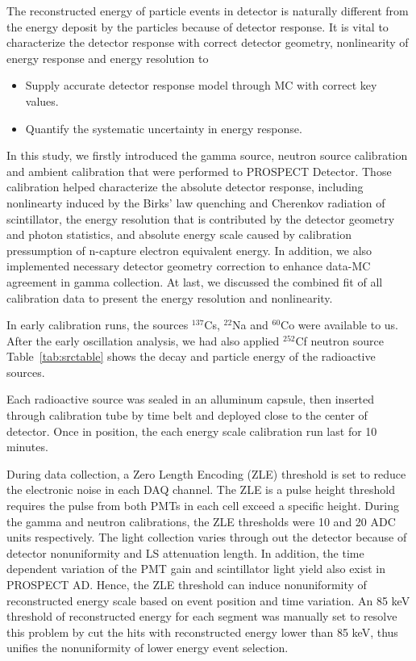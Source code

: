 
The reconstructed energy of particle events in detector is naturally different from the energy deposit by the particles because of detector response. 
It is vital to characterize the detector response with correct detector geometry, nonlinearity of energy response and energy resolution to
\begin{itemize}
    \item Supply accurate detector response model through MC with correct key values.
    \item Quantify the systematic uncertainty in energy response. 
\end{itemize}

In this study, we firstly introduced the gamma source, neutron source calibration and ambient calibration that were performed to PROSPECT Detector. 
Those calibration helped characterize the absolute detector response, including nonlinearty induced by the Birks' law quenching and Cherenkov radiation of scintillator, the energy resolution that is contributed by the detector geometry and photon statistics, and absolute energy scale caused by calibration pressumption of n-capture electron equivalent energy. 
In addition, we also implemented necessary detector geometry correction to enhance data-MC agreement in gamma collection.
At last, we discussed the combined fit of all calibration data to present the energy resolution and nonlinearity.



In early calibration runs, the sources $^{137}$Cs, $^{22}$Na and $^{60}$Co were available to us. 
After the early oscillation analysis, we had also applied $^{252}$Cf neutron source 
Table~\ref{tab:srctable} shows the decay and particle energy of the radioactive sources.

Each radioactive source was sealed in an alluminum capsule, then inserted through calibration tube by time belt and deployed close to the center of detector.
Once in position, the each energy scale calibration run last for 10 minutes.

During data collection, a Zero Length Encoding (ZLE) threshold is set to reduce the electronic noise in each DAQ channel.
The ZLE is a pulse height threshold requires the pulse from both PMTs in each cell exceed a specific height.
During the gamma and neutron calibrations, the ZLE thresholds were 10 and 20 ADC units respectively.
The light collection varies through out the detector because of detector nonuniformity and LS attenuation length.
In addition, the time dependent variation of the PMT gain and scintillator light yield also exist in PROSPECT AD.
Hence, the ZLE threshold can induce nonuniformity of reconstructed energy scale based on event position and time variation.
An 85 keV threshold of reconstructed energy for each segment was manually set to resolve this problem by cut the hits with reconstructed energy lower than 85 keV, thus unifies the nonuniformity of lower energy event selection. 

